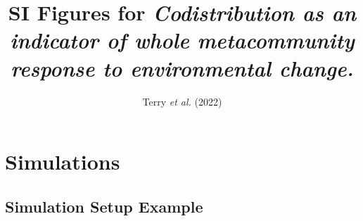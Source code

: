 \documentclass[
]{article}
\title{SI Figures for \emph{Codistribution as an indicator of whole
metacommunity response to environmental change.}}
\author{Terry \emph{et al.} (2022)}
\date{}
\begin{document}
\maketitle

{
\setcounter{tocdepth}{2}
\tableofcontents
}
\newpage

\hypertarget{simulations}{%
\section{Simulations}\label{simulations}}

\hypertarget{simulation-setup-example}{%
\subsection{Simulation Setup Example}\label{simulation-setup-example}}
\end{document}
